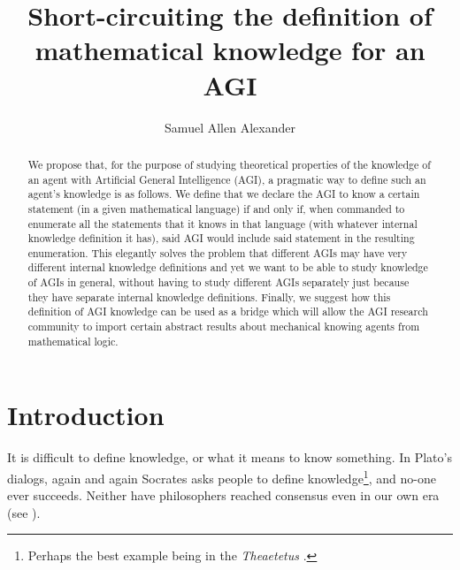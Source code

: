 \documentclass[runningheads]{llncs}
\begin{document}
\title{Short-circuiting the definition of mathematical knowledge for an AGI
}


\author{Samuel Allen
Alexander}



\maketitle

\begin{abstract}
We propose that, for the purpose of studying theoretical properties of
the knowledge of an agent with Artificial General Intelligence (AGI),
a pragmatic way to define such an agent's knowledge is as follows.
We define that we declare the AGI to know a certain statement
(in a given mathematical language) if and only if, when commanded
to enumerate all the statements that it knows in that language
(with whatever internal knowledge definition it has), said AGI
would include said statement in the resulting enumeration.
This elegantly solves the problem that different AGIs may have
very different internal knowledge definitions and yet we want
to be able to study knowledge of AGIs in general, without having
to study different AGIs separately just because they have separate
internal knowledge definitions. Finally, we suggest how this
definition of AGI knowledge can be used as a bridge which will
allow the AGI research community to import certain abstract results
about mechanical knowing agents from mathematical logic.
\end{abstract}

\section{Introduction}

It is difficult to define knowledge, or what it means to know something.
In Plato's dialogs, again and again Socrates asks people to define
knowledge\footnote{Perhaps the best example being in the \emph{Theaetetus}
\cite{theaetetus}.}, and no-one ever succeeds. Neither have philosophers
reached consensus even in our own era (see \cite{sep-knowledge-analysis}).
\end{document}
